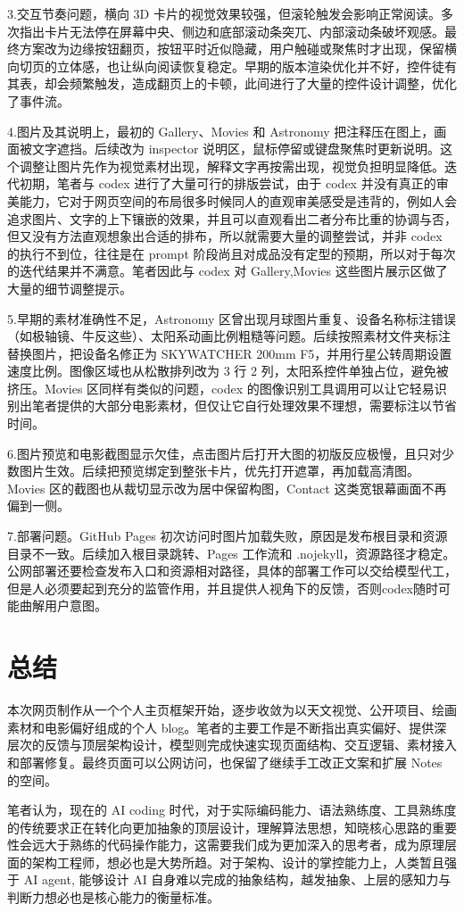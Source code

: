 \documentclass[UTF8,a4paper]{ctexart}
\begin{document}
3.交互节奏问题，横向 3D 卡片的视觉效果较强，但滚轮触发会影响正常阅读。多次指出卡片无法停在屏幕中央、侧边和底部滚动条突兀、内部滚动条破坏观感。最终方案改为边缘按钮翻页，按钮平时近似隐藏，用户触碰或聚焦时才出现，保留横向切页的立体感，也让纵向阅读恢复稳定。早期的版本渲染优化并不好，控件徒有其表，却会频繁触发，造成翻页上的卡顿，此间进行了大量的控件设计调整，优化了事件流。

4.图片及其说明上，最初的 Gallery、Movies 和 Astronomy 把注释压在图上，画面被文字遮挡。后续改为 inspector 说明区，鼠标停留或键盘聚焦时更新说明。这个调整让图片先作为视觉素材出现，解释文字再按需出现，视觉负担明显降低。迭代初期，笔者与 codex 进行了大量可行的排版尝试，由于 codex 并没有真正的审美能力，它对于网页空间的布局很多时候同人的直观审美感受是违背的，例如人会追求图片、文字的上下镶嵌的效果，并且可以直观看出二者分布比重的协调与否，但又没有方法直观想象出合适的排布，所以就需要大量的调整尝试，并非 codex 的执行不到位，往往是在 prompt 阶段尚且对成品没有定型的预期，所以对于每次的迭代结果并不满意。笔者因此与 codex 对 Gallery,Movies 这些图片展示区做了大量的细节调整提示。

5.早期的素材准确性不足，Astronomy 区曾出现月球图片重复、设备名称标注错误（如极轴镜、牛反这些）、太阳系动画比例粗糙等问题。后续按照素材文件夹标注替换图片，把设备名修正为 SKYWATCHER 200mm F5，并用行星公转周期设置速度比例。图像区域也从松散排列改为 3 行 2 列，太阳系控件单独占位，避免被挤压。Movies 区同样有类似的问题，codex 的图像识别工具调用可以让它轻易识别出笔者提供的大部分电影素材，但仅让它自行处理效果不理想，需要标注以节省时间。

6.图片预览和电影截图显示欠佳，点击图片后打开大图的初版反应极慢，且只对少数图片生效。后续把预览绑定到整张卡片，优先打开遮罩，再加载高清图。Movies 区的截图也从裁切显示改为居中保留构图，Contact 这类宽银幕画面不再偏到一侧。

7.部署问题。GitHub Pages 初次访问时图片加载失败，原因是发布根目录和资源目录不一致。后续加入根目录跳转、Pages 工作流和 .nojekyll，资源路径才稳定。公网部署还要检查发布入口和资源相对路径，具体的部署工作可以交给模型代工，但是人必须要起到充分的监管作用，并且提供人视角下的反馈，否则codex随时可能曲解用户意图。



\section{总结}

本次网页制作从一个个人主页框架开始，逐步收敛为以天文视觉、公开项目、绘画素材和电影偏好组成的个人 blog。笔者的主要工作是不断指出真实偏好、提供深层次的反馈与顶层架构设计，模型则完成快速实现页面结构、交互逻辑、素材接入和部署修复。最终页面可以公网访问，也保留了继续手工改正文案和扩展 Notes 的空间。

笔者认为，现在的 AI coding 时代，对于实际编码能力、语法熟练度、工具熟练度的传统要求正在转化向更加抽象的顶层设计，理解算法思想，知晓核心思路的重要性会远大于熟练的代码操作能力，这需要我们成为更加深入的思考者，成为原理层面的架构工程师，想必也是大势所趋。对于架构、设计的掌控能力上，人类暂且强于 AI agent, 能够设计 AI 自身难以完成的抽象结构，越发抽象、上层的感知力与判断力想必也是核心能力的衡量标准。
\end{document}
